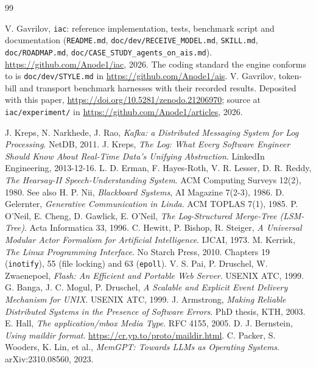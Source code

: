 \documentclass[11pt]{article}
\newcommand{\code}[1]{\texttt{#1}}
\begin{document}
\begin{thebibliography}{99}

 V. Gavrilov, \code{iac}: reference implementation, tests, benchmark script and documentation (\code{README.md}, \code{doc/dev/RECEIVE\_MODEL.md}, \code{SKILL.md}, \code{doc/ROADMAP.md}, \code{doc/CASE\_STUDY\_agents\_on\_ais.md}). \url{https://github.com/Anode1/iac}, 2026. The coding standard the engine conforms to is \code{doc/dev/STYLE.md} in \url{https://github.com/Anode1/ais}.
 V. Gavrilov, token-bill and transport benchmark harnesses with their recorded results. Deposited with this paper, \url{https://doi.org/10.5281/zenodo.21206970}; source at \code{iac/experiment/} in \url{https://github.com/Anode1/articles}, 2026.

 J. Kreps, N. Narkhede, J. Rao, \emph{Kafka: a Distributed Messaging System for Log Processing}. NetDB, 2011.
 J. Kreps, \emph{The Log: What Every Software Engineer Should Know About Real-Time Data's Unifying Abstraction}. LinkedIn Engineering, 2013-12-16.
 L. D. Erman, F. Hayes-Roth, V. R. Lesser, D. R. Reddy, \emph{The Hearsay-II Speech-Understanding System}. ACM Computing Surveys 12(2), 1980. See also H. P. Nii, \emph{Blackboard Systems}, AI Magazine 7(2-3), 1986.
 D. Gelernter, \emph{Generative Communication in Linda}. ACM TOPLAS 7(1), 1985.
 P. O'Neil, E. Cheng, D. Gawlick, E. O'Neil, \emph{The Log-Structured Merge-Tree (LSM-Tree)}. Acta Informatica 33, 1996.
 C. Hewitt, P. Bishop, R. Steiger, \emph{A Universal Modular Actor Formalism for Artificial Intelligence}. IJCAI, 1973.
 M. Kerrisk, \emph{The Linux Programming Interface}. No Starch Press, 2010. Chapters 19 (\code{inotify}), 55 (file locking) and 63 (\code{epoll}).
 V. S. Pai, P. Druschel, W. Zwaenepoel, \emph{Flash: An Efficient and Portable Web Server}. USENIX ATC, 1999.
 G. Banga, J. C. Mogul, P. Druschel, \emph{A Scalable and Explicit Event Delivery Mechanism for UNIX}. USENIX ATC, 1999.
 J. Armstrong, \emph{Making Reliable Distributed Systems in the Presence of Software Errors}. PhD thesis, KTH, 2003.
 E. Hall, \emph{The application/mbox Media Type}. RFC 4155, 2005.
 D. J. Bernstein, \emph{Using maildir format}. \url{https://cr.yp.to/proto/maildir.html}.
 C. Packer, S. Wooders, K. Lin, et al., \emph{MemGPT: Towards LLMs as Operating Systems}. arXiv:2310.08560, 2023.

\end{thebibliography}
\end{document}
